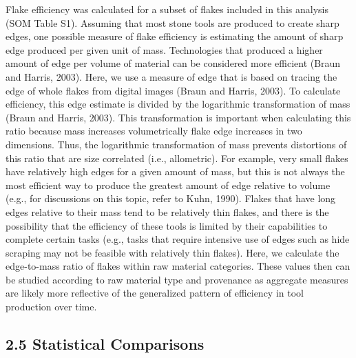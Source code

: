 \documentclass[]{elsarticle} %
\begin{document}
Flake efficiency was calculated for a subset of flakes included in this
analysis (SOM Table S1). Assuming that most stone tools are produced to
create sharp edges, one possible measure of flake efficiency is
estimating the amount of sharp edge produced per given unit of mass.
Technologies that produced a higher amount of edge per volume of
material can be considered more efficient (\hspace{0pt}Braun and Harris,
2003\hspace{0pt}). Here, we use a measure of edge that is based on
tracing the edge of whole flakes from digital images (\hspace{0pt}Braun
and Harris, 2003\hspace{0pt}). To calculate efficiency, this edge
estimate is divided by the logarithmic transformation of mass
(\hspace{0pt}Braun and Harris, 2003\hspace{0pt}). This transformation is
important when calculating this ratio because mass increases
volumetrically flake edge increases in two dimensions. Thus, the
logarithmic transformation of mass prevents distortions of this ratio
that are size correlated (i.e., allometric). For example, very small
flakes have relatively high edges for a given amount of mass, but this
is not always the most efficient way to produce the greatest amount of
edge relative to volume (e.g., for discussions on this topic, refer to
\hspace{0pt}Kuhn, 1990\hspace{0pt}). Flakes that have long edges
relative to their mass tend to be relatively thin flakes, and there is
the possibility that the efficiency of these tools is limited by their
capabilities to complete certain tasks (e.g., tasks that require
intensive use of edges such as hide scraping may not be feasible with
relatively thin flakes). Here, we calculate the edge-to-mass ratio of
flakes within raw material categories. These values then can be studied
according to raw material type and provenance as aggregate measures are
likely more reflective of the generalized pattern of efficiency in tool
production over time.

\hypertarget{statistical-comparisons}{%
\subsection{2.5 Statistical Comparisons}\label{statistical-comparisons}}
\end{document}
